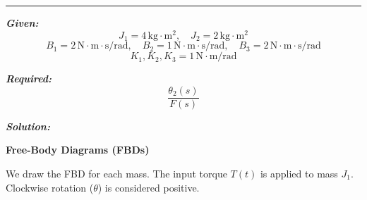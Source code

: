 \documentclass[11pt]{article}
\begin{document}
\noindent\rule{\textwidth}{1pt}

\vspace{12pt}


\noindent\textbf{\textit{Given:}}
\[
J_1 = 4\, \text{kg}\cdot\text{m}^2, \quad J_2 = 2\, \text{kg}\cdot\text{m}^2
\]
\[
B_1 = 2\, \text{N}\cdot\text{m}\cdot\text{s/rad}, \quad B_2 = 1\, \text{N}\cdot\text{m}\cdot\text{s/rad}, \quad B_3 = 2\, \text{N}\cdot\text{m}\cdot\text{s/rad}
\]
\[
K_1,K_2,K_3 = 1\, \text{N}\cdot\text{m/rad} 
\]

\vspace{1em}
\noindent

\noindent\textbf{\textit{Required:}}
\[
\frac{\theta_2(s)}{F(s)}
\]

\vspace{1.5em}
\noindent\textbf{\textit{Solution:}}

\vspace{8pt}

\noindent\textbf{Free-Body Diagrams (FBDs)}

\vspace{8pt}
\noindent We draw the FBD for each mass. The input torque $T(t)$ is applied to mass $J_1$. Clockwise rotation ($\theta$) is considered positive.
\end{document}
